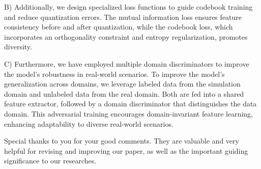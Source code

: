 \documentclass[12pt,a4paper]{article}
\begin{document}
B) Additionally, we design specialized loss functions to guide codebook training and reduce quantization errors. The mutual information loss ensures feature consistency before and after quantization, while the codebook loss, which incorporates an orthogonality constraint and entropy regularization, promotes diversity.

C) Furthermore, we have employed multiple domain discriminators to improve the model's robustness in real-world scenarios. To improve the model's generalization across domains, we leverage labeled data from the simulation domain and unlabeled data from the real domain. Both are fed into a shared feature extractor, followed by a domain discriminator that distinguishes the data domain. This adversarial training encourages domain-invariant feature learning, enhancing adaptability to diverse real-world scenarios.

\vspace{6ex}
Special thanks to you for your good comments. They are valuable and very helpful for revising and improving our paper, as well as the important guiding significance to our researches.
\end{document}
